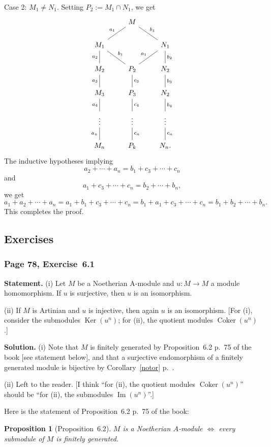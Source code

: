 \documentclass[12pt,letterpaper]{article}%
\newcommand{\oo}{\operatorname}\newcommand{\ooo}{\operatorname*}
\newcommand{\nn}{\noindent}
\newtheorem{prop}[thm]{Proposition}
\begin{document}
Case 2: $M_1\ne N_1$. Setting $P_2:=M_1\cap N_1$, we get 
$$
\begin{tikzcd}
&M\ar[dl,dash,"a_1"']\ar[dr,dash,"b_1"]\\ 
M_1\ar[d,dash,"a_2"']\ar[dr,dash,"b_1"]&&N_1\ar[d,dash,"b_2"]\ar[dl,dash,"a_1"']\\ 
M_2\ar[d,dash,"a_3"']&P_2\ar[d,dash,"c_3"]&N_2\ar[d,dash,"b_3"]\\ 
M_3\ar[d,dash,"a_4"']&P_3\ar[d,dash,"c_4"]&N_2\ar[d,dash,"b_4"]\\ 
\vdots\ar[d,dash,"a_n"']&\vdots\ar[d,dash,"c_n"]&\vdots\ar[d,dash,"c_n"]\\ 
M_n&P_k&N_n.
\end{tikzcd}
$$ 
The inductive hypotheses implying 
$$
a_2+\cdots+a_n=b_1+c_3+\cdots+c_n
$$ 
and 
$$
a_1+c_3+\cdots+c_n=b_2+\cdots+b_n,
$$ 
we get 
$$
a_1+a_2+\cdots+a_n=a_1+b_1+c_3+\cdots+c_n=b_1+a_1+c_3+\cdots+c_n=b_1+b_2+\cdots+b_n.
$$ 
This completes the proof.

\subsection{Exercises}%

\subsubsection{Page 78, Exercise~6.1}%

\textbf{Statement.} (i) Let $M$ be a Noetherian A-module and $u:M\to M$ a module homomorphism. If $u$ is surjective, then $u$ is an isomorphism.

\nn(ii) If $M$ is Artinian and $u$ is injective, then again $u$ is an isomorphism.
[For (i), consider the submodules $\oo{Ker}(u^n)$; for (ii), the quotient modules $\oo{Coker}(u^n)$.]

\nn\textbf{Solution.} (i) Note that $M$ is finitely generated by Proposition~6.2 p.~75 of the book [see statement below], and that a surjective endomorphism of a finitely generated module is bijective by Corollary~\ref{notor} p.~\pageref{notor}.

\nn(ii) Left to the reader. [I think ``for (ii), the quotient modules $\oo{Coker}(u^n)$'' should be ``for (ii), the submodules $\oo{Im}(u^n)$''.]

Here is the statement of Proposition~6.2 p.~75 of the book:

\begin{prop}[Proposition~6.2]
$M$ is a Noetherian $A$-module $\iff$ every submodule of $M$ is finitely generated.
\end{prop}
\end{document}
